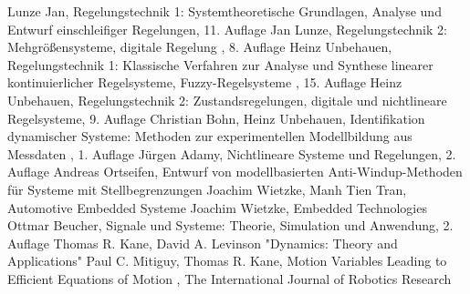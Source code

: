 \begin{thebibliography}{999}%
 Lunze Jan, \grqq Regelungstechnik 1: Systemtheoretische Grundlagen, Analyse und Entwurf einschleifiger Regelungen\grqq , 11. Auflage
 Jan Lunze, \glqq Regelungstechnik 2: Mehgrößensysteme, digitale Regelung \grqq , 8. Auflage
 Heinz Unbehauen, \glqq Regelungstechnik 1: Klassische Verfahren zur Analyse und Synthese linearer kontinuierlicher Regelsysteme, Fuzzy-Regelsysteme \grqq , 15. Auflage
 Heinz Unbehauen, \glqq Regelungstechnik 2: Zustandsregelungen, digitale und nichtlineare Regelsysteme\grqq , 9. Auflage
 Christian Bohn, Heinz Unbehauen, \glqq Identifikation dynamischer Systeme: Methoden zur experimentellen Modellbildung aus Messdaten \grqq , 1. Auflage
 Jürgen Adamy, \glqq Nichtlineare Systeme und Regelungen\grqq , 2. Auflage
 Andreas Ortseifen, \glqq Entwurf von modellbasierten Anti-Windup-Methoden für Systeme mit Stellbegrenzungen\grqq
 Joachim Wietzke, Manh Tien Tran, \glqq Automotive Embedded Systeme\grqq
 Joachim Wietzke, \glqq Embedded Technologies\grqq
 Ottmar Beucher, \glqq Signale und Systeme: Theorie, Simulation und Anwendung\grqq , 2. Auflage
 Thomas R. Kane, David A. Levinson "Dynamics: Theory and Applications"
 Paul C. Mitiguy, Thomas R. Kane, \glqq Motion Variables Leading to Efficient Equations of Motion \grqq , The International Journal of Robotics Research

\end{thebibliography}
